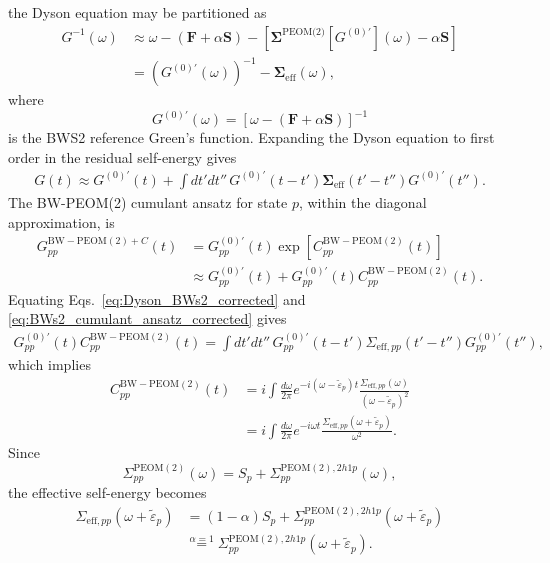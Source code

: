 the Dyson equation may be partitioned as
\begin{align}
G^{-1}(\omega)
&\approx
\omega
-
\left(
\mathbf{F}
+
\alpha \mathbf{S}
\right)
-
\left[
\bm{\Sigma}^{\text{PEOM(2)}}[G^{(0)'}](\omega)
-
\alpha \mathbf{S}
\right]
\\
&=
\left(
G^{(0)'}(\omega)
\right)^{-1}
-
\bm{\Sigma}_{\mathrm{eff}}(\omega),
\end{align}
where
\begin{equation}
G^{(0)'}(\omega)
=
\left[
\omega
-
\left(
\mathbf{F}
+
\alpha \mathbf{S}
\right)
\right]^{-1}
\end{equation}
is the BWS2 reference Green's function. Expanding the Dyson equation to first order in the residual
self-energy gives
\begin{align}
G(t)
\approx
G^{(0)'}(t)
+
\int dt' dt''\,
G^{(0)'}(t-t')
\bm{\Sigma}_{\mathrm{eff}}(t'-t'')
G^{(0)'}(t'').
\label{eq:Dyson_BWs2_corrected}
\end{align}
The BW-PEOM(2) cumulant ansatz for state $p$, within the diagonal
approximation, is
\begin{align}
G_{pp}^{\mathrm{BW-PEOM(2)}+C}(t)
&=
G_{pp}^{(0)'}(t)
\exp\left[
C_{pp}^{\mathrm{BW-PEOM(2)}}(t)
\right]
\\
&\approx
G_{pp}^{(0)'}(t)
+
G_{pp}^{(0)'}(t)
C_{pp}^{\mathrm{BW-PEOM(2)}}(t).
\label{eq:BWs2_cumulant_ansatz_corrected}
\end{align}
Equating
Eqs.~\eqref{eq:Dyson_BWs2_corrected} and
\eqref{eq:BWs2_cumulant_ansatz_corrected}
gives
\begin{align}
G_{pp}^{(0)'}(t)
C_{pp}^{\mathrm{BW-PEOM(2)}}(t)
=
\int dt' dt''\,
G_{pp}^{(0)'}(t-t')
\Sigma_{\mathrm{eff},pp}(t'-t'')
G_{pp}^{(0)'}(t''),
\end{align}
which implies
\begin{align}
C_{pp}^{\mathrm{BW-PEOM(2)}}(t)
&=
i
\int
\frac{d\omega}{2\pi}
e^{-i(\omega-\tilde{\varepsilon}_p)t}
\frac{
\Sigma_{\mathrm{eff},pp}(\omega)
}{
(\omega-\tilde{\varepsilon}_p)^2
}
\\
&=
i
\int
\frac{d\omega}{2\pi}
e^{-i\omega t}
\frac{
\Sigma_{\mathrm{eff},pp}
(\omega+\tilde{\varepsilon}_p)
}{
\omega^2
}.
\label{eq:peom_cumulant_general}
\end{align}
Since
\begin{equation}
\Sigma_{pp}^{\mathrm{PEOM(2)}}(\omega)
=
S_p
+
\Sigma_{pp}^{\mathrm{PEOM(2)},2h1p}(\omega),
\end{equation}
the effective self-energy becomes
\begin{align}
\Sigma_{\mathrm{eff},pp}
(\omega+\tilde{\varepsilon}_p)
&=
(1-\alpha)S_p
+
\Sigma_{pp}^{\mathrm{PEOM(2)},2h1p}
(\omega+\tilde{\varepsilon}_p)\\
&\overset{\alpha=1}{=}
\Sigma_{pp}^{\mathrm{PEOM(2)},2h1p}
(\omega+\tilde{\varepsilon}_p)
.
\end{align}
